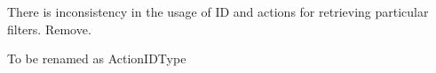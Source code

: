 
\begin{DoxyRefList}
\item[\label{todo__todo000001}%
\Hypertarget{todo__todo000001}%
Class \hyperlink{class_mesh_lab_interface}{Mesh\+Lab\+Interface} ]There is inconsistency in the usage of ID and actions for retrieving particular filters. Remove. 
\item[\label{todo__todo000002}%
\Hypertarget{todo__todo000002}%
Member \hyperlink{class_mesh_lab_interface_a233eea4713fe11e32e59294016c46f0f}{Mesh\+Lab\+Interface\+:\+:Mesh\+Lab\+Interface} ()]To be renamed as Action\+I\+D\+Type 
\end{DoxyRefList}